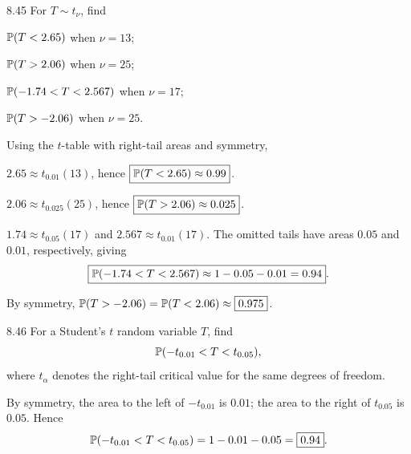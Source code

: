 \documentclass[11pt,oneside]{article}
\begin{document}
\begin{exercise}{8.45}
For $T\sim t_\nu$, find
\begin{exercisesubparts}
\item $\mathbb{P}(T<2.65)$ when $\nu=13$;
\item $\mathbb{P}(T>2.06)$ when $\nu=25$;
\item $\mathbb{P}(-1.74<T<2.567)$ when $\nu=17$;
\item $\mathbb{P}(T>-2.06)$ when $\nu=25$.
\end{exercisesubparts}
\end{exercise}
\begin{solution}
Using the $t$-table with right-tail areas and symmetry,
\begin{exercisesubparts}
\item $2.65\approx t_{0.01}(13)$, hence $\boxed{\mathbb{P}(T<2.65)\approx0.99}$.
\item $2.06\approx t_{0.025}(25)$, hence $\boxed{\mathbb{P}(T>2.06)\approx0.025}$.
\item $1.74\approx t_{0.05}(17)$ and $2.567\approx t_{0.01}(17)$. The omitted tails have areas $0.05$ and $0.01$, respectively, giving
\[
\boxed{\mathbb{P}(-1.74<T<2.567)\approx1-0.05-0.01=0.94}.
\]
\item By symmetry, $\mathbb{P}(T>-2.06)=\mathbb{P}(T<2.06)\approx\boxed{0.975}$.
\end{exercisesubparts}
\end{solution}

\begin{exercise}{8.46}
For a Student's $t$ random variable $T$, find
\[
\mathbb{P}(-t_{0.01}<T<t_{0.05}),
\]
where $t_\alpha$ denotes the right-tail critical value for the same degrees of freedom.
\end{exercise}
\begin{solution}
By symmetry, the area to the left of $-t_{0.01}$ is $0.01$; the area to the right of $t_{0.05}$ is $0.05$. Hence
\[
\mathbb{P}(-t_{0.01}<T<t_{0.05})
=1-0.01-0.05=\boxed{0.94}.
\]
\end{solution}
\end{document}
